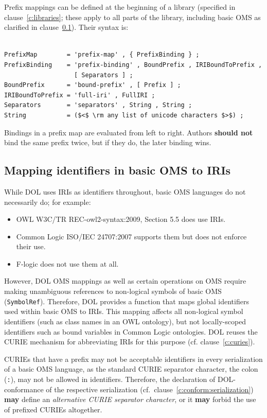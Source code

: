 \documentclass[10pt,fleqn,%
\ifpretendfinal
final%
\else
draft%
\fi,
]{scrreprt}
\makeatletter
\newcommand*{\cf}{cf.\@\xspace}
\newcommand*\CommentAuthor{}
\renewcommand*\CommentAuthor{#1}}
\newcommand*\CommentDate{}
\renewcommand*\CommentDate{#1}}
\newcommand*\CommentId{}
\renewcommand*\CommentId{#1}}
\newcommand*\CommentType{}
\renewcommand*\CommentType{#1}}
\newcommand*{\SetCommentColorByType}[1]{%
\edef\localType{{#1}}%
\expandafter\ifstrequal\localType{q-aut}{\colorlet{CommentColor}{red}}{%
\expandafter\ifstrequal\localType{q-all}{\colorlet{CommentColor}{orange}}{%
\expandafter\ifstrequal\localType{todo}{\colorlet{CommentColor}{orange}}{%
\expandafter\ifstrequal\localType{fyi}{\colorlet{CommentColor}{lightgray}}{%
\colorlet{CommentColor}{yellow}}}}}}
\newcommand*{\SetCommentPrefixByType}[1]{%
\edef\localType{{#1}}%
\expandafter\@ifmtarg\localType{%
\edef\CommentPrefix{}%
}{%
\caseupper[q]{#1}%
\edef\CommentPrefix{\thestring: }%
}}
\newcommand*{\initComment}[1]{%
\setkeys{Comment}{#1}%
\SetCommentColorByType{\CommentType}%
\relax%
\SetCommentPrefixByType{\CommentType}%
\relax%
}
\newcommand*{\todonote}[2][]{%
\initComment{#1}%
\pdfcomment[author=\CommentAuthor,color=CommentColor,date=\CommentDate,id=\CommentId]{%
\CommentPrefix
#2}}
\renewcommand*{\todonote}[2][]{%
\initComment{#1}%
\ednote{\CommentPrefix #2}}
\newcommand*{\CLnote}[2][author=Christoph Lange]{%
\todonote[author=Christoph Lange,#1]{#2} 
}
\newcommand*{\syntax}[1]{\texttt{#1}}
\newcommand*{\shouldnot}{\textbf{should not}\xspace}
\newcommand*{\may}{\textbf{may}\xspace}
\newcommand{\clauserefname}{clause}
\newcommand{\cref}[1]{\clauserefname~\ref{#1}}
\newcommand{\ssclause}[1]{\subsection{#1}}
\newcommand{\nisref}[1]{#1}
\makeatother
\begin{document}
Prefix mappings can be defined at the beginning of a library (specified in \cref{c:libraries}; 
these apply to all parts of the library, including basic OMS as clarified in \cref{c:map-ids}).  
Their syntax is:
\begin{lstlisting}[language=ebnf,escapeinside={()}]  % abstract syntax

PrefixMap        = 'prefix-map' , { PrefixBinding } ;
PrefixBinding    = 'prefix-binding' , BoundPrefix , IRIBoundToPrefix ,
                   [ Separators ] ;
BoundPrefix      = 'bound-prefix' , [ Prefix ] ;
IRIBoundToPrefix = 'full-iri' , FullIRI ;
Separators       = 'separators' , String , String ;
String           = ($<$ \rm any list of unicode characters $>$) ;
\end{lstlisting}

Bindings in a prefix map are evaluated from left to right.  Authors \shouldnot bind the same prefix twice, but if they do, the later binding wins.

\ssclause{Mapping identifiers in basic OMS to IRIs}\label{c:map-ids}

While DOL uses IRIs as identifiers throughout, basic OMS languages do not necessarily do; for example:
\begin{itemize}
\item OWL \nisref{W3C/TR REC-owl2-syntax:2009, Section 5.5} does use IRIs.
\item Common Logic \nisref{ISO/IEC 24707:2007} supports them but does not enforce their use.
\item F-logic \cite{flogic} does not use them at all.
\end{itemize}
However, DOL OMS mappings as well as 
certain operations on OMS require making unambiguous references to non-logical symbols of basic OMS (\syntax{SymbolRef}).  Therefore, DOL provides a function that maps global identifiers used within basic OMS to IRIs.  This mapping affects all non-logical symbol identifiers (such as class names in an OWL ontology), but not locally-scoped identifiers such as bound variables in Common Logic ontologies.  DOL reuses the CURIE mechanism for abbreviating IRIs for this purpose (\cf \cref{c:curies}).

CURIEs that have a prefix may not be acceptable identifiers in every serialization of a basic OMS language,
as the standard CURIE separator character, the colon (\syntax{:}), may not be allowed in identifiers.  
Therefore, the declaration of DOL-conformance of the respective serialization (cf.\ \cref{c:conform:serialization}) \may define an \emph{alternative CURIE separator character}, or it \may forbid the use of prefixed CURIEs altogether.
\end{document}
